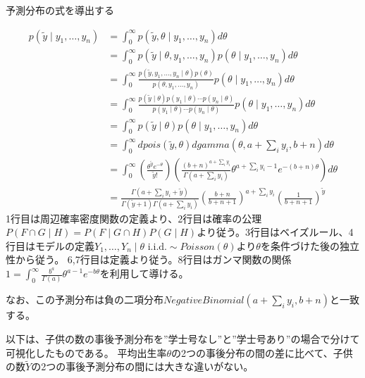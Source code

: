 \documentclass[
]{article}
\begin{document}
予測分布の式を導出する

\[
\begin{aligned}
  p(\tilde{y}\mid y_{1},\dots, y_{n}) &= \int_{0}^{\infty}p(\tilde{y}, \theta \mid y_{1},\dots,y_{n})d\theta\\
  &= \int_{0}^{\infty}p(\tilde{y}\mid \theta, y_{1},\dots,y_{n})p(\theta\mid y_{1},\dots,y_{n})d\theta\\
  &= \int_{0}^{\infty}\frac{p(\tilde{y},y_{1},\dots,y_{n}\mid \theta)p(\theta)}{p(\theta, y_{1}, \dots,y_{n})} p(\theta\mid y_{1},\dots,y_{n})d\theta\\
  &= \int_{0}^{\infty}\frac{p(\tilde{y}\mid\theta)p(y_{1}\mid\theta)\cdots p(y_{n}\mid\theta)}{p(y_{1}\mid\theta)\cdots p(y_{n}\mid\theta)}p(\theta\mid y_{1},\dots,y_{n})d\theta\\
  &= \int_{0}^{\infty}p(\tilde{y}\mid \theta)p(\theta\mid y_{1},\dots,y_{n})d\theta\\
  &= \int_{0}^{\infty}dpois(\tilde{y},\theta)dgamma(\theta, a + \sum_{i} y_{i}, b+n)d\theta\\
  &= \int_{0}^{\infty}\left(\frac{\theta^{\tilde{y}}e^{-\theta}}{\tilde{y}!}\right)\left(\frac{(b+n)^{a+\sum_{i}y_{i}}}{\Gamma(a + \sum_{i}y_{i})}\theta^{a+\sum_{i}y_{i}-1}e^{-(b+n)\theta}\right)d\theta\\
  &= \frac{\Gamma(a+\sum_{i}y_{i}+\tilde{y})}{\Gamma(\tilde{y}+1)\Gamma(a+\sum_{i}y_{i})}\left(\frac{b+n}{b+n+1}\right)^{a+\sum_{i}y_{i}}\left(\frac{1}{b+n+1}\right)^{\tilde{y}}
\end{aligned}
\]
1行目は周辺確率密度関数の定義より、2行目は確率の公理\(P(F\cap G\mid H) = P(F \mid G\cap H)P(G\mid H)\)より従う。3行目はベイズルール、4行目はモデルの定義\(Y_{1},\dots,Y_{n}\mid \theta \,\,\text{i.i.d.} \sim Poisson(\theta)\)より\(\theta\)を条件づけた後の独立性から従う。
6,7行目は定義より従う。8行目はガンマ関数の関係\(1=\int_{0}^{\infty}\frac{b^a}{\Gamma(a)}\theta^{a-1}e^{-b\theta}\)を利用して導ける。

なお、この予測分布は負の二項分布\(NegativeBinomial(a+\sum_{i}y_{i}, b+n)\)と一致する。

以下は、子供の数の事後予測分布を''学士号なし''と''学士号あり''の場合で分けて可視化したものである。
平均出生率\(\theta\)の2つの事後分布の間の差に比べて、子供の数\(\tilde{Y}\)の2つの事後予測分布の間には大きな違いがない。
\end{document}
